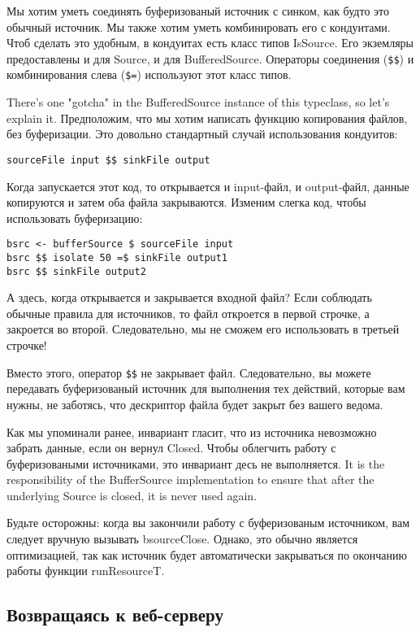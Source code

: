 Мы хотим уметь соединять буферизованый источник с синком, как будто это обычный источник.
Мы также хотим уметь комбинировать его с кондуитами. Чтоб сделать это удобным, в кондуитах
есть класс типов IsSource. Его экземляры предоставлены и для Source, и для BufferedSource. 
Операторы соединения (\verb#$$#) и комбинирования слева (\verb#$=#) используют этот класс типов.

There's one "gotcha" in the BufferedSource instance of this typeclass, so
let's explain it. Предположим, что мы хотим написать функцию копирования файлов, без буферизации. Это довольно стандартный случай использования кондуитов:
\begin{lstlisting}
sourceFile input $$ sinkFile output
\end{lstlisting}
Когда запускается этот код, то открывается и input-файл, и output-файл, данные копируются и затем оба файла закрываются. Изменим слегка код, чтобы использовать буферизацию:
\begin{lstlisting}
bsrc <- bufferSource $ sourceFile input
bsrc $$ isolate 50 =$ sinkFile output1
bsrc $$ sinkFile output2
\end{lstlisting}
А здесь, когда открывается и закрывается входной файл? Если соблюдать обычные правила для источников, то файл откроется в первой строчке, а закроется во второй. Следовательно, мы не сможем его использовать в третьей строчке!

Вместо этого, оператор \verb#$$# не закрывает файл. Следовательно, вы можете передавать буферизованый источник для выполнения тех действий, которые вам нужны, не заботясь, что дескриптор файла будет закрыт без вашего ведома.

Как мы упоминали ранее, инвариант гласит, что из источника невозможно забрать данные, если он вернул Closed. Чтобы облегчить работу с буферизоваными источниками, это инвариант десь не выполняется. It is the responsibility of
the BufferSource implementation to ensure that after the underlying
Source is closed, it is never used again.

Будьте осторожны: когда вы закончили работу с буферизованым источником, вам следует вручную вызывать bsourceClose. Однако, это обычно является оптимизацией, так как источник будет автоматически закрываться по окончанию работы функции runResourceT.

\subsection{Возвращаясь к веб-серверу}

